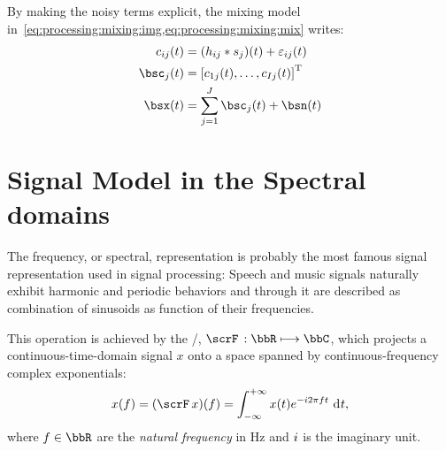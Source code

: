 \mynewline
By making the noisy terms explicit, the mixing model in~\cref{eq:processing:mixing:img,eq:processing:mixing:mix} writes:
\begin{align}
    \img_{\idxMic\idxSrc}(t) &=  \kparen{h_{\idxMic\idxSrc} \conv \src_\idxSrc} (t) +  \varepsilon_{ij}(t)\\
    \imgs_\idxSrc(t)         &= \ktranspose{\klist{\img_{1\idxSrc}(t), \dots, \img_{\numMics\idxSrc}(t)}} \nonumber\\
    \mics(t)                 &= \sum_{\idxSrc=1}^{\numSrcs} \imgs_\idxSrc(t) + \bsn( t)
\end{align}


\section{Signal Model in the Spectral domains}\label{sec:processing:domains}

The frequency, or spectral, representation is probably the most famous signal representation used in signal processing:
Speech and music signals naturally exhibit harmonic and periodic behaviors and
through it are described as combination of sinusoids as function of their frequencies.

This operation is achieved by the \FTdef/, $\fourierTrans{}:\bbR\kmapsto\bbC$, which projects a continuous-time-domain signal $x$ onto a space spanned by continuous-frequency complex exponentials:
\begin{equation}\label{eq:processing:ft}
    x(f) = (\fourierTrans{x})(f) =
        \int_{-\infty}^{+\infty}
        x(t)
        \cste^{-\csti 2 \pi f t}
        \,\kdiff{t}
    ,
\end{equation}
where $f \in \bbR$ are the \textit{natural frequency} in $\si{\Hz}$ and ${i}$ is the imaginary unit.

